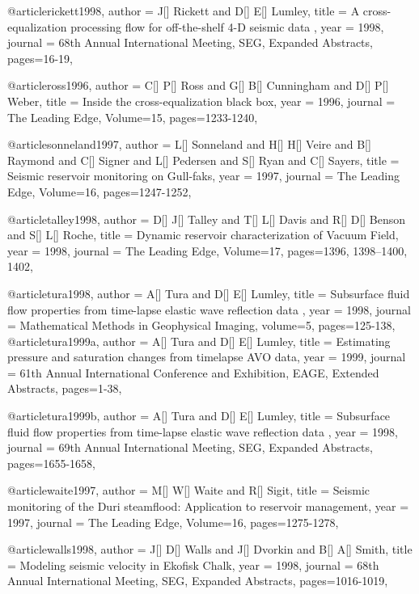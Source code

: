 @article{rickett1998,
  author =	 {J[] Rickett and D[] E[] Lumley},
  title =	 { A cross-equalization processing flow for off-the-shelf 4-D seismic data },
  year =	 1998,
  journal =	 {68th Annual International Meeting, SEG, Expanded Abstracts},
 pages=16-19,
}

@article{ross1996,
  author =	 {C[] P[] Ross and G[] B[] Cunningham and D[] P[] Weber},
  title =	 {Inside the cross-equalization black box},
  year =	 1996,
  journal =	 {The Leading Edge},
    Volume=15,
 pages=1233-1240,
}

@article{sonneland1997,
  author =	 {L[] Sonneland and H[] H[] Veire and B[] Raymond and C[] Signer and L[] Pedersen and S[] Ryan and C[] Sayers},
  title =	 {Seismic reservoir monitoring on Gull-faks},
  year =	 1997,
  journal =	 {The Leading Edge},
    Volume=16,
 pages=1247-1252,
}

@article{talley1998,
  author =	 {D[] J[] Talley and T[] L[] Davis and R[] D[] Benson and S[] L[] Roche},
  title =	 {Dynamic reservoir characterization of Vacuum Field},
  year =	 1998,
  journal =	 {The Leading Edge},
    Volume=17,
 pages=1396, 1398–1400, 1402,
}

@article{tura1998,
  author =	 {A[] Tura and D[] E[] Lumley},
  title =	 { Subsurface fluid flow properties from time-lapse elastic wave reflection data },
  year =	 1998,
  journal =	 {Mathematical Methods in Geophysical Imaging},
  volume=5,
 pages=125-138,
}
@article{tura1999a,
  author =	 {A[] Tura and D[] E[] Lumley},
  title =	 {Estimating pressure and saturation changes from timelapse AVO data},
  year =	 1999,
  journal =	 {61th Annual International Conference and Exhibition, EAGE, Extended Abstracts},
 pages=1-38,
}

@article{tura1999b,
  author =	 {A[] Tura and D[] E[] Lumley},
  title =	 { Subsurface fluid flow properties from time-lapse elastic wave reflection data },
  year =	 1998,
 journal =	 {69th Annual International Meeting, SEG, Expanded Abstracts},
 pages=1655-1658,
}

@article{waite1997,
  author =	 {M[] W[] Waite and R[] Sigit},
  title =	 {Seismic monitoring of the Duri steamflood: Application to reservoir management},
  year =	 1997,
  journal =	 {The Leading Edge},
    Volume=16,
 pages=1275-1278,
}

@article{walls1998,
  author =	 {J[] D[] Walls and J[] Dvorkin and B[] A[] Smith},
  title =	 {Modeling seismic velocity in Ekofisk Chalk},
  year =	 1998,
 journal =	 {68th Annual International Meeting, SEG, Expanded Abstracts},
 pages=1016-1019,
}

